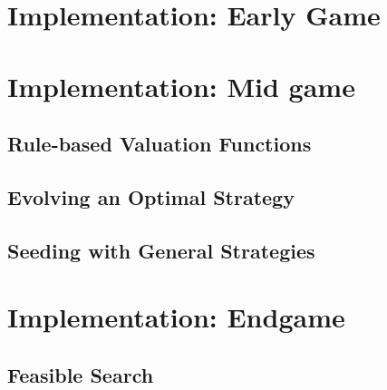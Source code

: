 \documentclass[twoside]{article}
\begin{document}
\begin{multicols}{2}

\section{Implementation: Early Game}


\section{Implementation: Mid game}

\subsection{Rule-based Valuation Functions}

\subsection{Evolving an Optimal Strategy}

\subsection{Seeding with General Strategies}


\section{Implementation: Endgame}

\subsection{Feasible Search}



\begin{thebibliography}{99} %


\end{thebibliography}


\end{multicols}
\end{document}
